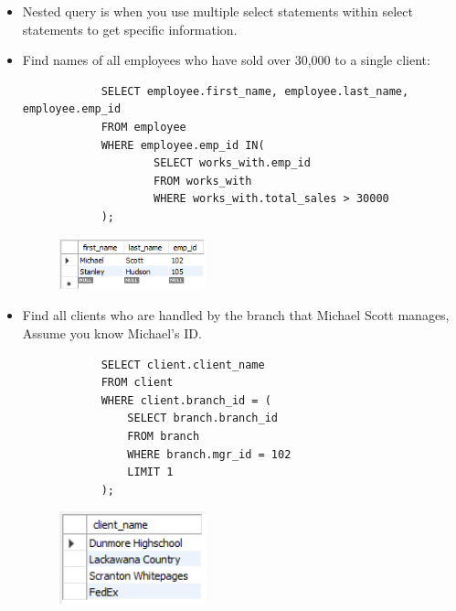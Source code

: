 \begin{itemize}
    \item Nested query is when you use multiple select statements within select statements to get specific information.
    \item Find names of all employees who have sold over 30,000 to a single client:
        \begin{verbatim}
            SELECT employee.first_name, employee.last_name, employee.emp_id
            FROM employee 
            WHERE employee.emp_id IN(
                    SELECT works_with.emp_id 
                    FROM works_with 
                    WHERE works_with.total_sales > 30000
            );
        \end{verbatim}
        \begin{figure}[H]
            \centering
            \includegraphics[width=0.4\textwidth]{./Figs/2020-12-24-21-51-11.png}
        \end{figure}
    
    \item Find all clients who are handled by the branch that Michael Scott manages, Assume you know Michael's ID.
        \begin{verbatim}
            SELECT client.client_name 
            FROM client 
            WHERE client.branch_id = (
                SELECT branch.branch_id 
                FROM branch 
                WHERE branch.mgr_id = 102
                LIMIT 1
            );
        \end{verbatim}
        \begin{figure}[H]
            \centering
            \includegraphics[width=0.4\textwidth]{./Figs/2020-12-24-21-51-49.png}
        \end{figure}
\end{itemize}
